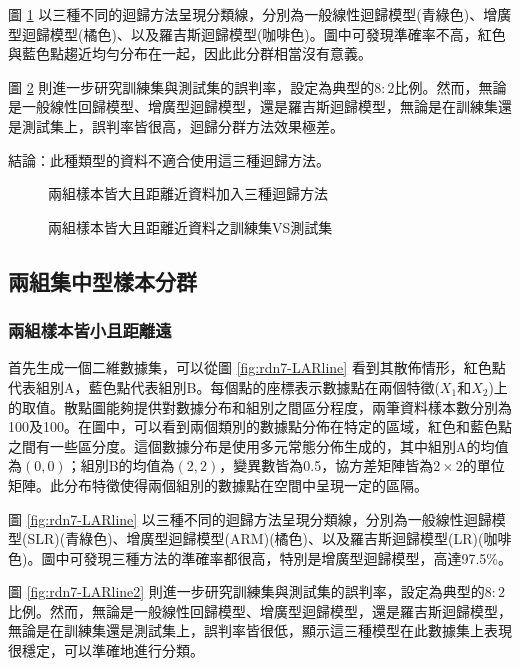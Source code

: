 \documentclass[12pt, a4paper]{article}
\begin{document}
圖 \ref{fig:rdn6-LARline} 以三種不同的迴歸方法呈現分類線，分別為一般線性迴歸模型(青綠色)、增廣型迴歸模型(橘色)、以及羅吉斯迴歸模型(咖啡色)。圖中可發現準確率不高，紅色與藍色點趨近均勻分布在一起，因此此分群相當沒有意義。

圖 \ref{fig:rdn6-LARline2} 則進一步研究訓練集與測試集的誤判率，設定為典型的$8:2$比例。然而，無論是一般線性回歸模型、增廣型迴歸模型，還是羅吉斯迴歸模型，無論是在訓練集還是測試集上，誤判率皆很高，迴歸分群方法效果極差。

結論：此種類型的資料不適合使用這三種迴歸方法。
\begin{figure}[H]
    \caption{兩組樣本皆大且距離近資料加入三種迴歸方法}
    \label{fig:rdn6-LARline}
\end{figure}
\begin{figure}[H]
    \caption{兩組樣本皆大且距離近資料之訓練集VS測試集}
    \label{fig:rdn6-LARline2}
\end{figure}


\subsection{兩組集中型樣本分群}
\subsubsection{兩組樣本皆小且距離遠}

首先生成一個二維數據集，可以從圖 \ref{fig:rdn7-LARline} 看到其散佈情形，紅色點代表組別A，藍色點代表組別B。每個點的座標表示數據點在兩個特徵($X_1$和$X_2$)上的取值。散點圖能夠提供對數據分布和組別之間區分程度，兩筆資料樣本數分別為100及100。在圖中，可以看到兩個類別的數據點分佈在特定的區域，紅色和藍色點之間有一些區分度。這個數據分布是使用多元常態分佈生成的，其中組別A的均值為$(0, 0)$；組別B的均值為$(2, 2)$，變異數皆為0.5，協方差矩陣皆為$2 \times 2$的單位矩陣。此分布特徵使得兩個組別的數據點在空間中呈現一定的區隔。

圖 \ref{fig:rdn7-LARline} 以三種不同的迴歸方法呈現分類線，分別為一般線性迴歸模型(SLR)(青綠色)、增廣型迴歸模型(ARM)(橘色)、以及羅吉斯迴歸模型(LR)(咖啡色)。圖中可發現三種方法的準確率都很高，特別是增廣型迴歸模型，高達97.5\%。

圖 \ref{fig:rdn7-LARline2} 則進一步研究訓練集與測試集的誤判率，設定為典型的$8:2$比例。然而，無論是一般線性回歸模型、增廣型迴歸模型，還是羅吉斯迴歸模型，無論是在訓練集還是測試集上，誤判率皆很低，顯示這三種模型在此數據集上表現很穩定，可以準確地進行分類。
\end{document}
